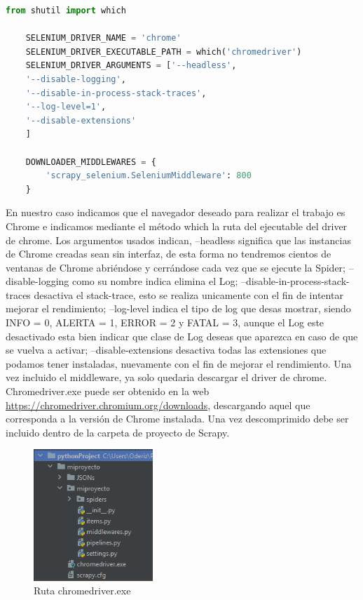 \begin{lstlisting}[language=Python, caption={Agua en Navarra configuración Selenium}]
	from shutil import which
	
	SELENIUM_DRIVER_NAME = 'chrome'
	SELENIUM_DRIVER_EXECUTABLE_PATH = which('chromedriver')
	SELENIUM_DRIVER_ARGUMENTS = ['--headless',
	'--disable-logging',
	'--disable-in-process-stack-traces',
	'--log-level=1',
	'--disable-extensions'
	]
	
	DOWNLOADER_MIDDLEWARES = {
		'scrapy_selenium.SeleniumMiddleware': 800
	}
\end{lstlisting}

En nuestro caso indicamos que el navegador deseado para realizar el trabajo es Chrome e indicamos mediante el método which la ruta del ejecutable del driver de chrome.\newline
\newline
Los argumentos usados indican, --headless significa que las instancias de Chrome creadas sean sin interfaz, de esta forma no tendremos cientos de ventanas de Chrome abriéndose y cerrándose cada vez que se ejecute la Spider; --disable-logging como su nombre indica elimina el Log; --disable-in-process-stack-traces desactiva el stack-trace, esto se realiza unicamente con el fin de intentar mejorar el rendimiento; --log-level indica el tipo de log que desas mostrar, siendo INFO = 0, ALERTA = 1, ERROR = 2 y FATAL = 3, aunque el Log este desactivado esta bien indicar que clase de Log deseas que aparezca en caso de que se vuelva a activar; --disable-extensions desactiva todas las extensiones que podamos tener instaladas, nuevamente con el fin de mejorar el rendimiento.\newline
\newline
Una vez incluido el middleware, ya solo quedaria descargar el driver de chrome.\newline
\newline
Chromedriver.exe puede ser obtenido en la web \url{https://chromedriver.chromium.org/downloads}, descargando aquel que corresponda a la versión de Chrome instalada. Una vez descomprimido debe ser incluido dentro de la carpeta de proyecto de Scrapy.

\begin{figure} [h!]
	\centering
	\includegraphics[width=0.4\textwidth]{fig/chromedriver.png}
	\caption[Ruta chromedriver.exe]{Ruta chromedriver.exe}
	\label{fig:ej15}
\end{figure}

